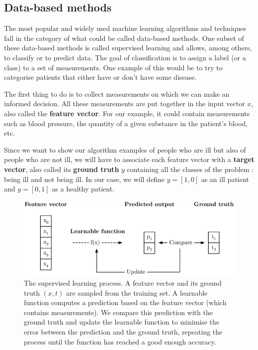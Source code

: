 \subsection{Data-based methods}
The most popular and widely used machine learning algorithms and techniques
fall in the category of what could be called data-based methods. One subset
of these data-based methods is called supervised learning and 
allows, among others, to classify or to predict data. 
The goal of classification is to assign a label (or a class) to a set of 
measurements. One example of this would be
to try to categorise patients that either have or don't have some disease.

The first thing to do is to collect measurements on which we can make an
informed decision. All these measurements are put together in 
the input vector $x$, also called the \textbf{feature vector}. For our example,
it could contain measurements such as blood pressure, the 
quantity of a given substance in the patient's blood, etc.

Since we want to show our algorithm examples of people who are ill but
also of people who are not ill, we will have to associate each feature vector
with a \textbf{target vector}, also called its \textbf{ground truth} $y$ 
containing all the classes of the problem : 
being ill and not being ill. In our case, we will define $y = [1, 0]$ as
an ill patient and $y = [0, 1]$ as a healthy patient.\\

\begin{figure}[H]
	\centering
	\includegraphics[width=0.8\linewidth]{fig/supervised_ml.eps}
	\caption{The supervised learning process. A feature vector and its ground
	truth $(x, t)$ are sampled from the training set. A learnable
	function computes a prediction based on the feature vector (which 
	contains measurements). We compare this prediction with the ground 
	truth and update the learnable function to minimise the error
	between the prediction and the ground truth, repeating the process
	until the function has reached a good enough accuracy.}
	\label{fig:supervised_ml}
\end{figure}


